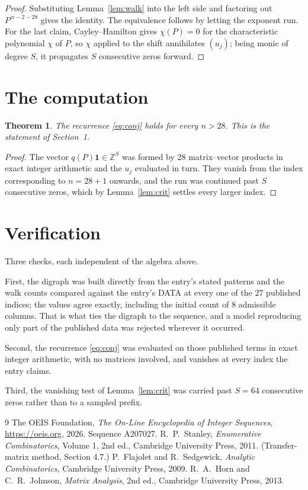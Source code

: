 \documentclass[11pt,a4paper]{article}
\theoremstyle{plain}
\newtheorem{theorem}{Theorem}
\theoremstyle{definition}
\begin{document}
\begin{proof}
Substituting Lemma~\ref{lem:walk} into the left side and factoring out
$P^{\,n-2-28}$ gives the identity. The equivalence follows by letting the exponent
run. For the last claim, Cayley--Hamilton gives $\chi(P)=0$ for the characteristic
polynomial $\chi$ of $P$, so $\chi$ applied to the shift annihilates $(u_j)$; being monic of
degree $S$, it propagates $S$ consecutive zeros forward.
\end{proof}

\section{The computation}

\begin{theorem}
The recurrence \eqref{eq:conj} holds for every $n>28$. This is the statement of
Section~1.
\end{theorem}

\begin{proof}
The vector $q(P)\mathbf{1}\in\mathbb{Z}^{S}$ was formed by $28$ matrix--vector
products in exact integer arithmetic and the $u_j$ evaluated in turn. They vanish from the
index corresponding to $n=28+1$ onwards, and the run was continued past $S$ consecutive
zeros, which by Lemma~\ref{lem:crit} settles every larger index.
\end{proof}

\section{Verification}

Three checks, each independent of the algebra above.

First, the digraph was built directly from the entry's stated patterns and the walk counts
compared against the entry's DATA at every one of the $27$ published indices; the
values agree exactly, including the initial count of $8$ admissible columns. That is
what ties the digraph to the sequence, and a model reproducing only part of the published
data was rejected wherever it occurred.

Second, the recurrence \eqref{eq:conj} was evaluated on those published terms in exact
integer arithmetic, with no matrices involved, and vanishes at every index the entry claims.

Third, the vanishing test of Lemma~\ref{lem:crit} was carried past $S=64$ consecutive
zeros rather than to a sampled prefix.

\begin{thebibliography}{9}
 The OEIS Foundation, \emph{The On-Line Encyclopedia of Integer
Sequences}, \url{https://oeis.org}, 2026. Sequence A207027.
 R.~P.~Stanley, \emph{Enumerative Combinatorics}, Volume 1, 2nd ed.,
Cambridge University Press, 2011. (Transfer-matrix method, Section 4.7.)
 P.~Flajolet and R.~Sedgewick, \emph{Analytic Combinatorics}, Cambridge
University Press, 2009.
 R.~A.~Horn and C.~R.~Johnson, \emph{Matrix Analysis}, 2nd ed., Cambridge
University Press, 2013.
\end{thebibliography}
\end{document}
